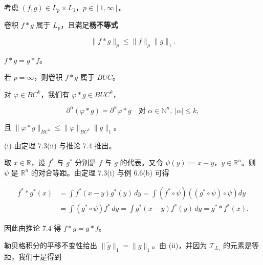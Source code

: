 \begin{theorem}

考虑 $ (f,g) \in L_{p} \times L_{1} $，$ p \in [1,\infty] $。

\begin{subitems}
\item

卷积 $ f * g $ 属于 $ L_{p} $，且满足\textbf{杨不等式}

\[
\|f * g\|_{p} \le \|f\|_{p}\|g\|_{1} .
\]
\item

$ f * g = g * f $。

\item

若 $ p = \infty $，则卷积 $ f * g $ 属于 $ BUC $。

\item

对 $ \varphi \in BC^{k} $，我们有 $ \varphi * g \in BUC^{k} $，

\[
\partial^{\alpha}(\varphi * g) = \partial^{\alpha}\varphi * g \quad \text{对 } \alpha \in \mathbb{N}^{n} , \ |\alpha| \le k ,
\]

且 $ \|\varphi * g\|_{BC^{k}} \le \|\varphi\|_{BC^{k}}\|g\|_{1} $。

\proofhead
(i) 由定理 7.3(ii) 与推论 7.4 推出。
\end{subitems}

\begin{subitems}
\item[（ii）]

取 $ x \in \mathbb{R} $，设 $ f^{*} $ 与 $ g^{*} $ 分别是 $ f $ 与 $ g $ 的代表。又令 $ \psi(y) := x-y $，$ y \in \mathbb{R}^{n} $。则 $ \psi $ 是 $ \mathbb{R}^{n} $ 的对合等距。由定理 7.3(i) 与例 6.6(b) 可得

\begin{equation*}
\begin{aligned}
f^{*} * g^{*}(x) &= \int f^{*}(x-y)g^{*}(y)\,dy = \int (f^{*} \circ \psi)\left((g^{*} \circ \psi) \circ \psi\right) dy \\ &= \int (g^{*} \circ \psi)f^{*}\,dy = \int g^{*}(x-y)f^{*}(y)\,dy = g^{*} * f^{*}(x) .
\end{aligned}
\end{equation*}

因此由推论 7.4 得 $ f * g = g * f $。

\item[（iii）]

勒贝格积分的平移不变性给出 $ \|\tilde{g}\|_{1} = \|g\|_{1} $。由 (ii)，并因为 $ \mathcal{T}_{L_{1}} $ 的元素是等距，我们于是得到


\end{subitems}
\end{theorem}
